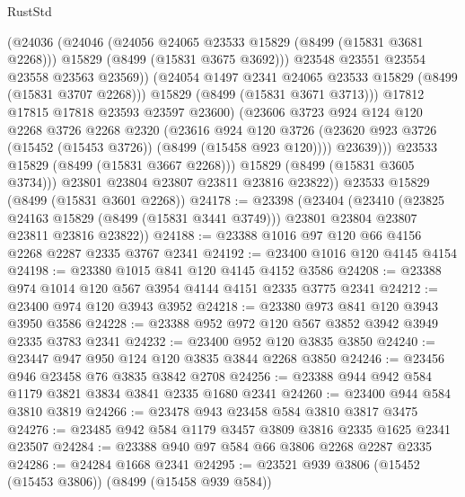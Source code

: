 \begin{lexlean}{RustStd}
\begin{coremodule}
                      (@24036
                        (@24046
                          (@24056 @24065 @23533 @15829 (@8499 (@15831 @3681 @2268)))
                          @15829
                          (@8499 (@15831 @3675 @3692)))
                        @23548
                        @23551
                        @23554
                        @23558
                        @23563
                        @23569))
                    (@24054 @1497 @2341 @24065 @23533 @15829 (@8499 (@15831 @3707 @2268)))
                    @15829
                    (@8499 (@15831 @3671 @3713)))
                  @17812
                  @17815
                  @17818
                  @23593
                  @23597
                  @23600)
                (@23606
                  @3723
                  @924
                  @124
                  @120
                  @2268
                  @3726
                  @2268
                  @2320
                  (@23616
                    @924
                    @120
                    @3726
                    (@23620 @923 @3726 (@15452 (@15453 @3726)) (@8499 (@15458 @923 @120))))
                  @23639)))
            @23533
            @15829
            (@8499 (@15831 @3667 @2268)))
          @15829
          (@8499 (@15831 @3605 @3734)))
        @23801
        @23804
        @23807
        @23811
        @23816
        @23822))
    @23533
    @15829
    (@8499 (@15831 @3601 @2268))
@24178 := @23398
    (@23404
      (@23410
        (@23825 @24163 @15829 (@8499 (@15831 @3441 @3749)))
        @23801
        @23804
        @23807
        @23811
        @23816
        @23822))
@24188 := @23388 @1016 @97 @120 @66 @4156 @2268 @2287 @2335 @3767 @2341
@24192 := @23400 @1016 @120 @4145 @4154
@24198 := @23380 @1015 @841 @120 @4145 @4152 @3586
@24208 := @23388 @974 @1014 @120 @567 @3954 @4144 @4151 @2335 @3775 @2341
@24212 := @23400 @974 @120 @3943 @3952
@24218 := @23380 @973 @841 @120 @3943 @3950 @3586
@24228 := @23388 @952 @972 @120 @567 @3852 @3942 @3949 @2335 @3783 @2341
@24232 := @23400 @952 @120 @3835 @3850
@24240 := @23447 @947 @950 @124 @120 @3835 @3844 @2268 @3850
@24246 := @23456 @946 @23458 @76 @3835 @3842 @2708
@24256 := @23388 @944 @942 @584 @1179 @3821 @3834 @3841 @2335 @1680 @2341
@24260 := @23400 @944 @584 @3810 @3819
@24266 := @23478 @943 @23458 @584 @3810 @3817 @3475
@24276 := @23485 @942 @584 @1179 @3457 @3809 @3816 @2335 @1625 @2341 @23507
@24284 := @23388 @940 @97 @584 @66 @3806 @2268 @2287 @2335
@24286 := @24284 @1668 @2341
@24295 := @23521 @939 @3806 (@15452 (@15453 @3806)) (@8499 (@15458 @939 @584))

\end{coremodule}
\end{lexlean}
